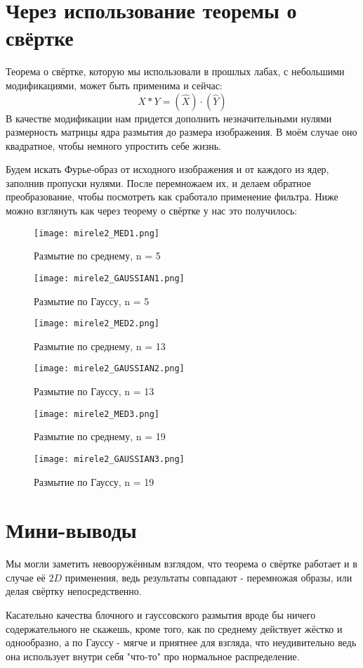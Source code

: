 \newpage
\section{Через использование теоремы о свёртке}
Теорема о свёртке, которую мы использовали в прошлых лабах, с небольшими модификациями, может быть применима и сейчас:
$$
X \ast Y = (\hat{X}) \cdot (\hat{Y})
$$
В качестве модификации нам придется дополнить незначительными нулями размерность матрицы ядра размытия до размера изображения. В моём случае оно квадратное, чтобы немного упростить себе жизнь.

Будем искать Фурье-образ от исходного изображения и от каждого из ядер, заполнив пропуски нулями. После перемножаем их, и делаем обратное преобразование, чтобы посмотреть как сработало применение фильтра. Ниже можно взглянуть как через теорему о свёртке у нас это получилось:

\begin{figure}[ht]
    \centering
    \texttt{[image: mirele2\_MED1.png]}
	\caption{Размытие по среднему, n = 5}
\end{figure}

\begin{figure}[ht]
    \centering
    \texttt{[image: mirele2\_GAUSSIAN1.png]}
	\caption{Размытие по Гауссу, n = 5}
\end{figure}
\newpage
\begin{figure}[ht]
    \centering
    \texttt{[image: mirele2\_MED2.png]}
	\caption{Размытие по среднему, n = 13}
\end{figure}
\newpage
\begin{figure}[ht]
    \centering
    \texttt{[image: mirele2\_GAUSSIAN2.png]}
	\caption{Размытие по Гауссу, n = 13}
\end{figure}

\begin{figure}[ht]
    \centering
    \texttt{[image: mirele2\_MED3.png]}
	\caption{Размытие по среднему, n = 19}
\end{figure}
\newpage
\begin{figure}[ht]
    \centering
    \texttt{[image: mirele2\_GAUSSIAN3.png]}
	\caption{Размытие по Гауссу, n = 19}
\end{figure}


\section{Мини-выводы}
Мы могли заметить невооружённым взглядом, что теорема о свёртке работает и в случае её $2D$ применения, 
ведь результаты совпадают - перемножая образы, или делая свёртку непосредственно.

Касательно качества блочного и гауссовского размытия вроде бы ничего содержательного не скажешь, кроме того, как по среднему действует жёстко и однообразно, 
а по Гауссу - мягче и приятнее для взгляда, что неудивительно ведь она использует внутри себя "что-то" про нормальное распределение.
\endinput